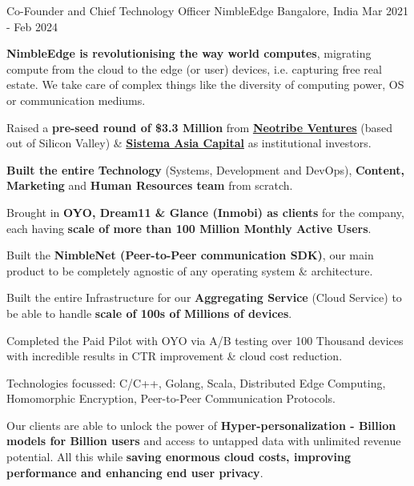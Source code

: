 \begin{cventries}
  \cventry
    {Co-Founder and Chief Technology Officer} %
    {NimbleEdge} %
    {Bangalore, India} %
    {Mar 2021 - Feb 2024} %
    {
      \begin{cvitems} %
      \item {\textbf{NimbleEdge is revolutionising the way world computes}, migrating compute from the cloud to the edge (or user) devices, i.e. capturing free real estate. We take care of complex things like the diversity of computing power, OS or communication mediums.}
        \item {Raised a \textbf{pre-seed round of \$3.3 Million} from \href{http://www.neotribe.vc/}{\textbf{Neotribe Ventures}} (based out of Silicon Valley) \& \href{https://sistemaasiacapital.com/}{\textbf{Sistema Asia Capital}} as institutional investors.}
        \item {\textbf{Built the entire Technology} (Systems, Development and DevOps), \textbf{Content, Marketing} and \textbf{Human Resources team} from scratch.}
        \item {Brought in \textbf{OYO, Dream11 \& Glance (Inmobi) as clients} for the company, each having \textbf{scale of more than 100 Million Monthly Active Users}.}
        \item {Built the \textbf{NimbleNet (Peer-to-Peer communication SDK)}, our main product to be completely agnostic of any operating system \& architecture.}
        \item {Built the entire Infrastructure for our \textbf{Aggregating Service} (Cloud Service) to be able to handle \textbf{scale of 100s of Millions of devices}.}
        \item {Completed the Paid Pilot with OYO via A/B testing over 100 Thousand devices with incredible results in CTR improvement \& cloud cost reduction.}
        \item {Technologies focussed: C/C++, Golang, Scala, Distributed Edge Computing, Homomorphic Encryption, Peer-to-Peer Communication Protocols.}
        \item {Our clients are able to unlock the power of \textbf{Hyper-personalization - Billion models for Billion users} and access to untapped data with unlimited revenue potential. All this while \textbf{saving enormous cloud costs, improving performance and enhancing end user privacy}.}
      \end{cvitems}
    }


\end{cventries}
